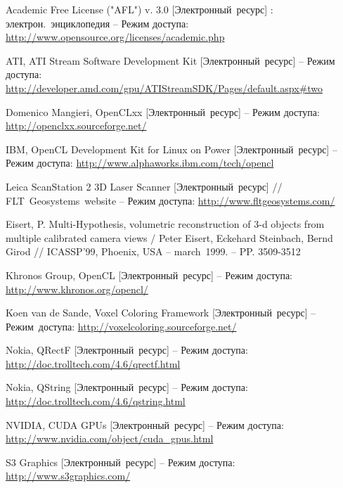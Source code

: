 \renewcommand{\refname}{Список литературы}
\begin{thebibliography}{99}

		Academic Free License ("AFL") v. 3.0 [Электронный~ресурс] : электрон.~энциклопедия -- Режим доступа:
		\url{http://www.opensource.org/licenses/academic.php}

		ATI, ATI Stream Software Development Kit [Электронный~ресурс]
		 -- Режим доступа:
		\url{http://developer.amd.com/gpu/ATIStreamSDK/Pages/default.aspx#two}

		Domenico Mangieri, OpenCLxx [Электронный~ресурс] -- Режим доступа:
		\url{http://openclxx.sourceforge.net/}


		IBM, OpenCL Development Kit for Linux on Power [Электронный~ресурс]
		-- Режим доступа:
		\url{http://www.alphaworks.ibm.com/tech/opencl}

		Leica ScanStation 2 3D Laser Scanner [Электронный~ресурс] //
		FLT~Geosystems~website -- Режим доступа:
		\url{http://www.fltgeosystems.com/}

		Eisert, P. Multi-Hypothesis, volumetric reconstruction of 3-d objects from multiple calibrated camera views /
		Peter Eisert, Eckehard Steinbach, Bernd Girod //
		ICASSP’99, Phoenix, USA -- march~1999. -- PP. 3509-3512

		Khronos Group, OpenCL [Электронный~ресурс] -- Режим доступа:
		\url{http://www.khronos.org/opencl/}

		Koen van de Sande, Voxel Coloring Framework [Электронный~ресурс]
		-- Режим~доступа:
		\url{http://voxelcoloring.sourceforge.net/}

		Nokia, QRectF [Электронный~ресурс]
		-- Режим доступа:
		\url{http://doc.trolltech.com/4.6/qrectf.html}

		Nokia, QString [Электронный~ресурс]
		-- Режим доступа:
		\url{http://doc.trolltech.com/4.6/qstring.html}

		NVIDIA, CUDA GPUs [Электронный~ресурс] -- Режим доступа:\\
		\url{http://www.nvidia.com/object/cuda_gpus.html}

		S3 Graphics [Электронный~ресурс] -- Режим доступа:
		\url{http://www.s3graphics.com/}


\end{thebibliography}
